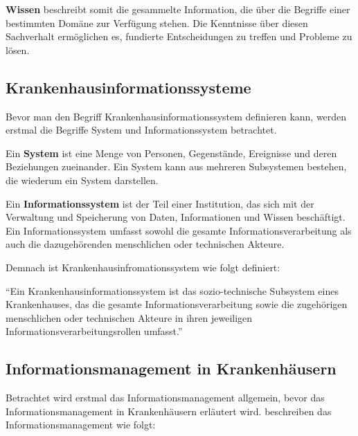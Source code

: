 \textbf{Wissen} beschreibt somit die gesammelte Information, die über die Begriffe einer bestimmten Domäne zur Verfügung stehen. 
Die Kenntnisse über diesen Sachverhalt ermöglichen es, fundierte Entscheidungen zu treffen und Probleme zu lösen.

\subsection{Krankenhausinformationssysteme}

Bevor man den Begriff Krankenhausinformationssystem definieren kann, werden erstmal die Begriffe System und Informationssystem betrachtet. \newline

Ein \textbf{System} ist eine Menge von Personen, Gegenstände, Ereignisse und deren Beziehungen zueinander. 
Ein System kann aus mehreren Subsystemen bestehen, die wiederum ein System darstellen. \citep[vgl.]{winter_health_2011} \newline

Ein \textbf{Informationssystem} ist der Teil einer Institution, das sich mit der Verwaltung und Speicherung von Daten, Informationen und Wissen beschäftigt.
Ein Informationssystem umfasst sowohl die gesamte Informationsverarbeitung als auch die dazugehörenden menschlichen oder technischen Akteure. \citep[vgl.]{winter_health_2011} \newline

Demnach ist Krankenhausinfromationssystem wie folgt definiert: 

\begin{definition}
	\enquote{Ein Krankenhausinformationssystem ist das sozio-technische Subsystem eines Krankenhauses, das die gesamte Informationsverarbeitung sowie die zugehörigen menschlichen oder technischen Akteure in ihren jeweiligen Informationsverarbeitungsrollen umfasst.} \citep{winter_health_2011}
\end{definition}

\subsection{Informationsmanagement in Krankenhäusern}

Betrachtet wird erstmal das Informationsmanagement allgemein, bevor das Informationsmanagement in Krankenhäusern erläutert wird.
\citet{gehring2022informationsmanagement} beschreiben das Informationsmanagement wie folgt: \\

